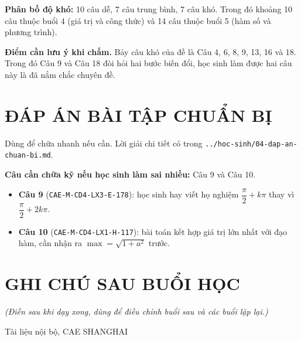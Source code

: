\documentclass[11pt, a4paper]{article}
\begin{document}
\textbf{Phân bố độ khó:} 10 câu dễ, 7 câu trung bình, 7 câu khó. Trong đó khoảng 10 câu thuộc buổi 4 (giá trị và công thức) và 14 câu thuộc buổi 5 (hàm số và phương trình).

\textbf{Điểm cần lưu ý khi chấm.} Bảy câu khó của đề là Câu 4, 6, 8, 9, 13, 16 và 18. Trong đó Câu 9 và Câu 18 đòi hỏi hai bước biến đổi, học sinh làm được hai câu này là đã nắm chắc chuyên đề.

\section{ĐÁP ÁN BÀI TẬP CHUẨN BỊ}

Dùng để chữa nhanh nếu cần. Lời giải chi tiết có trong \texttt{../hoc-sinh/04-dap-an-chuan-bi.md}.


\textbf{Câu cần chữa kỹ nếu học sinh làm sai nhiều:} Câu 9 và Câu 10.

\begin{itemize}[leftmargin=1.4em, itemsep=2pt]
\item \textbf{Câu 9} (\texttt{CAE-M-CD4-LX3-E-178}): học sinh hay viết họ nghiệm $\dfrac{\pi}{2} + k\pi$ thay vì $\dfrac{\pi}{2} + 2k\pi$.
\item \textbf{Câu 10} (\texttt{CAE-M-CD4-LX1-H-117}): bài toán kết hợp giá trị lớn nhất với đạo hàm, cần nhận ra $\max = \sqrt{1 + a^2}$ trước.
\end{itemize}

\section{GHI CHÚ SAU BUỔI HỌC}

\emph{(Điền sau khi dạy xong, dùng để điều chỉnh buổi sau và các buổi lặp lại.)}

\vspace{0.8cm}
\begin{center}
{\footnotesize\color{cae_blue} Tài liệu nội bộ, CAE SHANGHAI}
\end{center}
\end{document}
